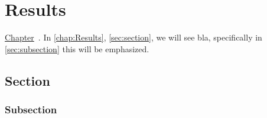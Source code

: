 \chapter{Results}
\label{chap:Results}

\hyperref[sec:index]{Chapter}~\cite{Hanser2019energy}. In \autoref{chap:Results}, \autoref{sec:section}, we will see bla, specifically in \autoref{sec:subsection} this will be emphasized. \Blindtext[2]
\section{Section}
\label{sec:section}

\Blindtext[6]
\subsection{Subsection}
\label{sec:subsection}

\Blindtext[3]
